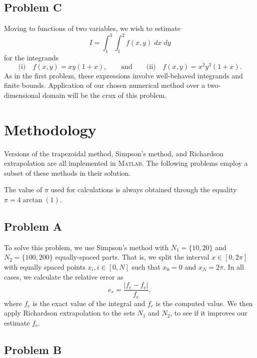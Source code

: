 \documentclass[12pt]{article}
\begin{document}
\subsection{Problem C}

Moving to functions of two variables, we wish to estimate
\begin{equation}
I = \int_1^3 \int_1^2 f(x,y) \; dx \; dy
\end{equation}
for the integrands
\begin{equation}
\text{(i)} \quad
f(x,y) = x y (1+x)
,
\qquad
\text{and}
\qquad
\text{(ii)} \quad
f(x,y) = x^2 y^3 (1+x)
.
\label{eq:c}
\end{equation}
As in the first problem, these expressions involve well-behaved integrands and finite bounds. Application of our chosen numerical method over a two-dimensional domain will be the crux of this problem.

\section{Methodology}

Versions of the trapezoidal method, Simpson's method, and Richardson extrapolation are all implemented in \textsc{Matlab}. The following problems employ a subset of these methods in their solution.

The value of $\pi$ used for calculations is always obtained through the equality $\pi = 4 \arctan(1)$.

\subsection{Problem A}

To solve this problem, we use Simpson's method with $N_1=\{10,20\}$ and $N_2=\{100,200\}$ equally-spaced parts. That is, we split the interval $x \in [0,2\pi]$ with equally spaced points $x_i, i \in [0,N]$ such that $x_0 = 0$ and $x_N = 2\pi$. In all cases, we calculate the relative error as
\begin{equation}
e_r = \frac{\left| f_e - f_c \right|}{f_e}
,
\end{equation}
where $f_e$ is the exact value of the integral and $f_c$ is the computed value. We then apply Richardson extrapolation to the sets $N_1$ and $N_2$, to see if it improves our estimate $f_c$.

\subsection{Problem B}
\end{document}
